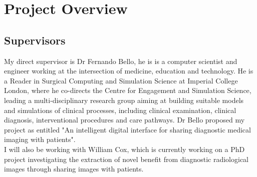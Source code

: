 \documentclass[12pt,twoside]{article}
\date{Juin 2018}
\begin{document}






\clearpage{\pagestyle{empty}\cleardoublepage}

\tableofcontents 


\clearpage{\pagestyle{empty}\cleardoublepage}
\setcounter{page}{1}
\fancyhead[LE,RO]{\slshape \rightmark}
\fancyhead[LO,RE]{\slshape \leftmark}

\section{Project Overview}

\subsection{Supervisors}

My direct supervisor is Dr Fernando Bello, he is  is a computer scientist and engineer working at the intersection of medicine, education and technology. He is a Reader in Surgical Computing and Simulation Science at Imperial College London, where he co-directs the Centre for Engagement and Simulation Science, leading a multi-disciplinary research group aiming at building suitable models and simulations of clinical processes, including clinical examination, clinical diagnosis, interventional procedures and care pathways.
Dr Bello proposed my project as entitled "An intelligent digital interface for sharing diagnostic medical imaging with patients".\\

I will also be working with William Cox, which is currently working on a PhD project investigating the extraction of novel benefit from diagnostic radiological images through sharing images with patients.\\ 
\end{document}
